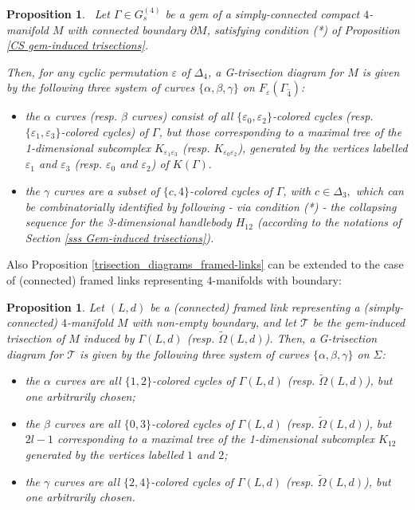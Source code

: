 \documentclass[12pt,a4paper]{article}
\newtheorem{proposition}[lemma]{Proposition}
\newcommand{\e}{\varepsilon}
\begin{document}
    \begin{proposition} \label{trisection_diagrams_gem-induced_boundary} \ 
Let $\Gamma\in G_s^{(4)}$ be a gem of a simply-connected compact $4$-manifold $M$ with connected boundary $\partial M$, satisfying condition (*) of Proposition \ref{CS gem-induced trisections}. 

Then, for any cyclic permutation $\varepsilon$ of $\Delta_4$, a G-trisection diagram for $M$ is given by the following three system of curves $\{ \alpha, \beta, \gamma\}$ on $F_\e(\Gamma_{\hat 4})$:
\begin{itemize}
\item[-] the $\alpha$ curves (resp. $\beta$ curves) consist of all $\{\e_0,\e_2\}$-colored cycles (resp. $\{\e_1,\e_3\}$-colored cycles) of $\Gamma$, but those corresponding to a maximal tree of the 1-dimensional subcomplex  
$K_{\e_1 \e_3}$ (resp. $K_{\e_0 \e_2}$),  generated by the vertices labelled $\e_1$ and $\e_3$ (resp. $\e_0$ and $\e_2$) of $K(\Gamma).$    
\item[-] the $\gamma$ curves are a subset of  $\{c,4\}$-colored cycles of $\Gamma$, with $c \in \Delta_3,$ which can be combinatorially identified by following - via condition (*) - the collapsing sequence for the 3-dimensional handlebody $H_{12}$ (according to the notations of Section \ref{sss Gem-induced trisections}).   
\end{itemize} 
\end{proposition} 

\bigskip 

Also Proposition \ref{trisection_diagrams_framed-links} can be extended to the case of (connected) framed links representing $4$-manifolds with boundary:  

 
 \begin{proposition}  \label{trisection_diagrams_gem-induced_framed-links}
Let $(L,d)$ be a (connected) framed link representing a (simply-connected) $4$-manifold $M$ with non-empty boundary, and let $\mathcal T$ be the gem-induced trisection of $M$ induced by $\Gamma(L,d)$ (resp. $\tilde \Omega(L,d)$). 
Then, a G-trisection diagram for $\mathcal  T$ is given by the following three system of curves $\{ \alpha, \beta, \gamma\}$ on $\Sigma$:
\begin{itemize}
    \item[-]  the $\alpha$ curves are all $\{1,2\}$-colored cycles of $\Gamma(L,d)$ (resp. $\tilde\Omega(L,d)$),
but one arbitrarily chosen;  

\item[-]  the $\beta$ curves are all $\{0,3\}$-colored cycles of $\Gamma(L,d)$ (resp. $\tilde\Omega(L,d)$), 
but $2l-1$ corresponding to a maximal tree of the 1-dimensional subcomplex $K_{12}$    generated by the vertices labelled $1$ and $2$;

\item[-]  the $\gamma$ curves are all $\{2,4\}$-colored cycles of $\Gamma(L,d)$ (resp. $\tilde\Omega(L,d)$), but one arbitrarily chosen.    
\end{itemize} 
\end{proposition} 
\end{document}
